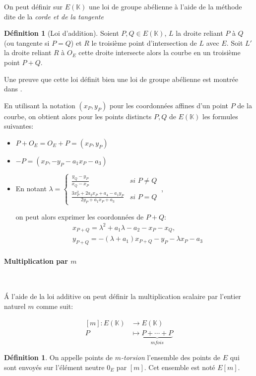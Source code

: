 \documentclass[10pt,a4paper]{book}
\theoremstyle{plain}
\theoremstyle{definition}
\theoremstyle{definition}
\theoremstyle{definition}
\theoremstyle{definition}
\newtheorem{defi}[thm]{Définition}
\theoremstyle{remark}
\theoremstyle{remark}
\begin{document}
On peut définir sur $E(\mathbb{K})$ une loi de groupe abélienne à l'aide de la méthode dite de la \emph{corde et de la tangente}

\begin{defi}[Loi d'addition]
Soient $P,Q \in E(\mathbb{K})$, $L$ la droite reliant $P$ à $Q$ (ou tangente si $P=Q$) et $R$ le troisième point d'intersection de $L$ avec $E$. Soit $L'$ la droite reliant $R$ à $O_E$ cette droite intersecte alors la courbe en un troisième point $P+Q$.
\end{defi}

Une preuve que cette loi définit bien une loi de groupe abélienne est montrée dans \cite[III.2.2]{Silv1}.

En utilisant la notation $(x_P,y_P)$ pour les coordonnées affines d'un point $P$ de la courbe, on obtient alors pour les points distincts $P,Q$ de $E(\mathbb{K})$ les formules suivantes:
\begin{itemize}
\item $P+O_E=O_E+P=(x_P,y_P)$
\item $-P=(x_P,-y_P-a_1x_P-a_3)$
\item En notant $\lambda= \begin{cases}
\frac{y_{Q}-y_{P}}{x_{Q}-x_{P}} & \textit{si } P\neq Q\\
\frac{3x_{P}^{2}+2a_{2}x_{P}+a_{4}-a_{1}y_{P}}{2y_{P}+a_{1}x_{P}+a_{3}} & \textit{si } P=Q
\end{cases}\ $,

on peut alors exprimer les coordonnées de $P+Q$:
\begin{equation*}
\begin{alignedat}{1}
& x_{P+Q}=\lambda^2 +a_1\lambda-a_2-x_P-x_Q,\\
& y_{P+Q}=-(\lambda +a_1)x_{P+Q}-y_{P}-\lambda x_P-a_3
\end{alignedat}
\end{equation*}
\end{itemize}




\paragraph*{Multiplication par $m$}\   {
\newline


\'A l'aide de la loi additive on peut définir la multiplication scalaire par l'entier naturel $m$ comme suit:

\begin{equation}
\begin{alignedat}{1}
[m]: E(\mathbb{K}) & \rightarrow E(\mathbb{K}) \\
P & \mapsto \underbrace{P+ \cdots +P}_{m fois} 
\end{alignedat}
\end{equation}

\begin{defi}
On appelle points de \emph{$m$-torsion} l'ensemble des points de $E$ qui sont envoyés sur l'élément neutre $0_E$ par $[m]$. Cet ensemble est noté $E[m]$.
\end{defi}
}
\end{document}
